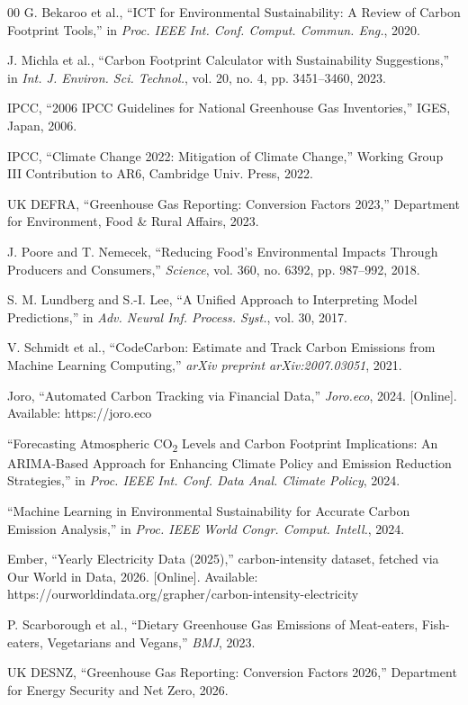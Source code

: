 \documentclass[conference]{IEEEtran}
\begin{document}
\begin{thebibliography}{00}
 G. Bekaroo et al., ``ICT for Environmental Sustainability: A Review of Carbon Footprint Tools,'' in \textit{Proc. IEEE Int. Conf. Comput. Commun. Eng.}, 2020.

 J. Michla et al., ``Carbon Footprint Calculator with Sustainability Suggestions,'' in \textit{Int. J. Environ. Sci. Technol.}, vol. 20, no. 4, pp. 3451--3460, 2023.

 IPCC, ``2006 IPCC Guidelines for National Greenhouse Gas Inventories,'' IGES, Japan, 2006.

 IPCC, ``Climate Change 2022: Mitigation of Climate Change,'' Working Group III Contribution to AR6, Cambridge Univ. Press, 2022.

 UK DEFRA, ``Greenhouse Gas Reporting: Conversion Factors 2023,'' Department for Environment, Food \& Rural Affairs, 2023.

 J. Poore and T. Nemecek, ``Reducing Food's Environmental Impacts Through Producers and Consumers,'' \textit{Science}, vol. 360, no. 6392, pp. 987--992, 2018.

 S. M. Lundberg and S.-I. Lee, ``A Unified Approach to Interpreting Model Predictions,'' in \textit{Adv. Neural Inf. Process. Syst.}, vol. 30, 2017.

 V. Schmidt et al., ``CodeCarbon: Estimate and Track Carbon Emissions from Machine Learning Computing,'' \textit{arXiv preprint arXiv:2007.03051}, 2021.

 Joro, ``Automated Carbon Tracking via Financial Data,'' \textit{Joro.eco}, 2024. [Online]. Available: https://joro.eco

 ``Forecasting Atmospheric CO\textsubscript{2} Levels and Carbon Footprint Implications: An ARIMA-Based Approach for Enhancing Climate Policy and Emission Reduction Strategies,'' in \textit{Proc. IEEE Int. Conf. Data Anal. Climate Policy}, 2024.

 ``Machine Learning in Environmental Sustainability for Accurate Carbon Emission Analysis,'' in \textit{Proc. IEEE World Congr. Comput. Intell.}, 2024.

 Ember, ``Yearly Electricity Data (2025),'' carbon-intensity dataset, fetched via Our World in Data, 2026. [Online]. Available: https://ourworldindata.org/grapher/carbon-intensity-electricity

 P. Scarborough et al., ``Dietary Greenhouse Gas Emissions of Meat-eaters, Fish-eaters, Vegetarians and Vegans,'' \textit{BMJ}, 2023.

 UK DESNZ, ``Greenhouse Gas Reporting: Conversion Factors 2026,'' Department for Energy Security and Net Zero, 2026.

\end{thebibliography}
\end{document}
